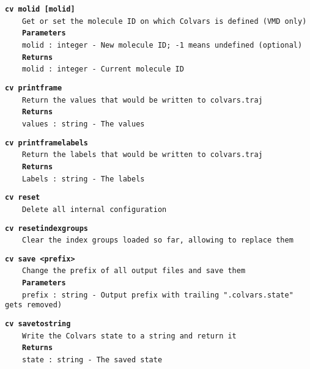 \begin{mdexampleinput}{}
\texttt{\textbf{cv molid [molid]}}
\\
\-~~~~\texttt{Get or set the molecule ID on which Colvars is defined (VMD only)}
\\
\-~~~~\texttt{\textbf{Parameters}}
\\
\-~~~~\texttt{molid : integer - New molecule ID; -1 means undefined (optional)}
\\
\-~~~~\texttt{\textbf{Returns}}
\\
\-~~~~\texttt{molid : integer - Current molecule ID}
\end{mdexampleinput}
\begin{mdexampleinput}{}
\texttt{\textbf{cv printframe}}
\\
\-~~~~\texttt{Return the values that would be written to colvars.traj}
\\
\-~~~~\texttt{\textbf{Returns}}
\\
\-~~~~\texttt{values : string - The values}
\end{mdexampleinput}
\begin{mdexampleinput}{}
\texttt{\textbf{cv printframelabels}}
\\
\-~~~~\texttt{Return the labels that would be written to colvars.traj}
\\
\-~~~~\texttt{\textbf{Returns}}
\\
\-~~~~\texttt{Labels : string - The labels}
\end{mdexampleinput}
\begin{mdexampleinput}{}
\texttt{\textbf{cv reset}}
\\
\-~~~~\texttt{Delete all internal configuration}
\end{mdexampleinput}
\begin{mdexampleinput}{}
\texttt{\textbf{cv resetindexgroups}}
\\
\-~~~~\texttt{Clear the index groups loaded so far, allowing to replace them}
\end{mdexampleinput}
\begin{mdexampleinput}{}
\texttt{\textbf{cv save <prefix>}}
\\
\-~~~~\texttt{Change the prefix of all output files and save them}
\\
\-~~~~\texttt{\textbf{Parameters}}
\\
\-~~~~\texttt{prefix : string - Output prefix with trailing ".colvars.state" gets removed)}
\end{mdexampleinput}
\begin{mdexampleinput}{}
\texttt{\textbf{cv savetostring}}
\\
\-~~~~\texttt{Write the Colvars state to a string and return it}
\\
\-~~~~\texttt{\textbf{Returns}}
\\
\-~~~~\texttt{state : string - The saved state}
\end{mdexampleinput}
